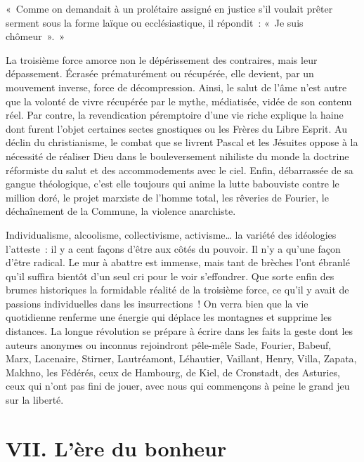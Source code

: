 \documentclass[french,twoside]{book} %
\newcommand{\astermono}{\medskip\centerline{\color{rubric}\large\selectfont{\syms ✻}}\medskip\par}%
\newenvironment{quoteblock}%
  {\begin{quoting}}
  {\end{quoting}}
\newenvironment{quotebar}{%
    \def\FrameCommand{{\color{rubric!10!}\vrule width 0.5em} \hspace{0.9em}}%
    \def\OuterFrameSep{\itemsep} %
    \MakeFramed {\advance\hsize-\width \FrameRestore}
  }%
  {%
    \endMakeFramed
  }
\renewenvironment{quoteblock}%
  {%
    \savenotes
    \setstretch{0.9}
    \normalfont
    \begin{quotebar}
  }
  {%
    \end{quotebar}
    \spewnotes
  }
\begin{document}
\begin{quoteblock}
\noindent « Comme on demandait à un prolétaire assigné en justice s’il voulait prêter serment sous la forme laïque ou ecclésiastique, il répondit : « Je suis chômeur ». »\end{quoteblock}

\noindent La troisième force amorce non le dépérissement des contraires, mais leur dépassement. Écrasée prématurément ou récupérée, elle devient, par un mouvement inverse, force de décompression. Ainsi, le salut de l’âme n’est autre que la volonté de vivre récupérée par le mythe, médiatisée, vidée de son contenu réel. Par contre, la revendication péremptoire d’une vie riche explique la haine dont furent l’objet certaines sectes gnostiques ou les Frères du Libre Esprit. Au déclin du christianisme, le combat que se livrent Pascal et les Jésuites oppose à la nécessité de réaliser Dieu dans le bouleversement nihiliste du monde la doctrine réformiste du salut et des accommodements avec le ciel. Enfin, débarrassée de sa gangue théologique, c’est elle toujours qui anime la lutte babouviste contre le million doré, le projet marxiste de l’homme total, les rêveries de Fourier, le déchaînement de la Commune, la violence anarchiste.\par

\astermono

\noindent Individualisme, alcoolisme, collectivisme, activisme… la variété des idéologies l’atteste : il y a cent façons d’être aux côtés du pouvoir. Il n’y a qu’une façon d’être radical. Le mur à abattre est immense, mais tant de brèches l’ont ébranlé qu’il suffira bientôt d’un seul cri pour le voir s’effondrer. Que sorte enfin des brumes historiques la formidable réalité de la troisième force, ce qu’il y avait de passions individuelles dans les insurrections ! On verra bien que la vie quotidienne renferme une énergie qui déplace les montagnes et supprime les distances. La longue révolution se prépare à écrire dans les faits la geste dont les auteurs anonymes ou inconnus rejoindront pêle-mêle Sade, Fourier, Babeuf, Marx, Lacenaire, Stirner, Lautréamont, Léhautier, Vaillant, Henry, Villa, Zapata, Makhno, les Fédérés, ceux de Hambourg, de Kiel, de Cronstadt, des Asturies, ceux qui n’ont pas fini de jouer, avec nous qui commençons à peine le grand jeu sur la liberté.
\section[{VII. L’ère du bonheur}]{VII. L’ère du bonheur}\renewcommand{\leftmark}{VII. L’ère du bonheur}
\end{document}
